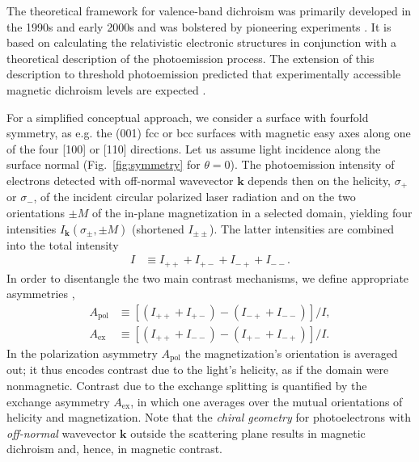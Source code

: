 \documentclass[prl,twocolumn,floatfix,superscriptaddress,aps]{revtex4-2}
\renewcommand{\vec}[1]{\boldsymbol{#1}}
\begin{document}
The theoretical framework for valence-band dichroism was primarily developed in the 1990s and early 2000s \cite{tamura1987, feder1996,henk1996,kuch1996a,feder1998,venus1994,venus1997,kuch2001} and was bolstered by pioneering experiments \cite{venus95, hild2008, hild2009, hild2010}. It is based on calculating the relativistic electronic  structures in conjunction with a theoretical description of the photoemission process. 
The extension of this description to threshold photoemission predicted that experimentally accessible magnetic dichroism levels are expected \cite{feder1998}. 


For a simplified conceptual approach, we consider a surface with fourfold symmetry, as e.g. the (001) fcc or bcc surfaces with magnetic easy axes along one of the four [100] 
or [110] 
directions. Let us assume light incidence along the surface normal (Fig.~\ref{fig:symmetry} for $\theta = 0$). The photoemission intensity of electrons detected with off-normal wavevector $\vec{k}$ depends then on the helicity, $\sigma_{+}$ or $\sigma_{-}$, of the incident circular polarized laser radiation and on the two orientations $\pm M$ of the in-plane magnetization in a selected domain, yielding four intensities $I_{\vec{k}}(\sigma_{\pm}, \pm M)$ (shortened $I_{\pm \pm}$). The latter intensities are combined into the total intensity
\begin{align}
    I & \equiv I_{+ +} + I_{+ -} + I_{- +} + I_{- -}. 
\end{align}
In order to disentangle the two main contrast mechanisms, we define appropriate asymmetries \cite{henk1998},
\begin{subequations}
\begin{align}
    A_{\mathrm{pol}} & \equiv \left[ \left( I_{+ +} + I_{+ -} \right) - \left( I_{- +} + I_{- -} \right) \right] / I,
    \label{eq:Apol}
    \\
    A_{\mathrm{ex}} & \equiv \left[ \left( I_{+ +} + I_{- -} \right) - \left( I_{+ -} + I_{- +} \right) \right] / I.
    \label{eq:Aex}
\end{align}    
\end{subequations}
In the polarization asymmetry $A_{\mathrm{pol}}$ the magnetization's orientation is averaged out; it thus encodes contrast due to the light's helicity, as if the domain were nonmagnetic. Contrast due to the exchange splitting is quantified by the exchange asymmetry $A_{\mathrm{ex}}$, in which one averages over the mutual orientations of helicity and magnetization. Note that the \emph{chiral geometry} for photoelectrons with \emph{off-normal} wavevector $\vec{k}$ outside the scattering plane results in magnetic dichroism and, hence, in magnetic contrast.
\end{document}
